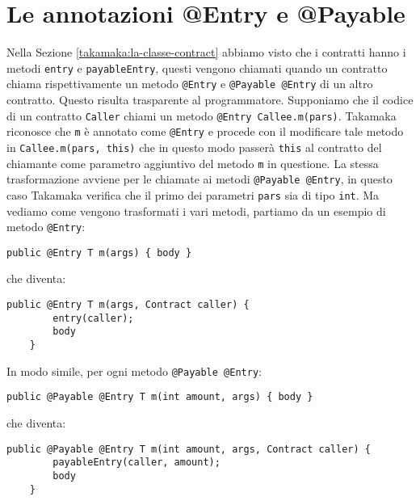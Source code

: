 \section{Le annotazioni @Entry e @Payable}	\label{takamaka:le-annotazioni}
Nella Sezione \ref{takamaka:la-classe-contract} abbiamo visto che i contratti hanno i metodi \lstinline|entry| e \lstinline|payableEntry|, questi vengono chiamati quando un contratto chiama rispettivamente un metodo \lstinline|@Entry| e \lstinline|@Payable @Entry| di un altro contratto. Questo risulta trasparente al programmatore. Supponiamo che il codice di un contratto \lstinline|Caller| chiami un metodo \lstinline|@Entry Callee.m(pars)|. Takamaka riconosce che \lstinline|m| è annotato come \lstinline|@Entry| e procede con il modificare tale metodo in \lstinline|Callee.m(pars, this)| che in questo modo passerà \lstinline|this| al contratto del chiamante come parametro aggiuntivo del metodo \lstinline|m| in questione. La stessa trasformazione avviene per le chiamate ai metodi \lstinline|@Payable @Entry|, in questo caso Takamaka verifica che il primo dei parametri \lstinline|pars| sia di tipo \lstinline|int|. Ma vediamo come vengono trasformati i vari metodi, partiamo da un esempio di metodo \lstinline|@Entry|:
%
\begin{lstlisting}[numbers=none,frame=none]
	public @Entry T m(args) { body }
\end{lstlisting}
%
che diventa:
%
\begin{lstlisting}[numbers=none,frame=none]
	public @Entry T m(args, Contract caller) {
		entry(caller);
		body
	}
\end{lstlisting}
%
In modo simile, per ogni metodo \lstinline|@Payable @Entry|:
%
\begin{lstlisting}[numbers=none,frame=none]
	public @Payable @Entry T m(int amount, args) { body }
\end{lstlisting}
%
che diventa:
%
\begin{lstlisting}[numbers=none,frame=none]
	public @Payable @Entry T m(int amount, args, Contract caller) {
		payableEntry(caller, amount);
		body
	}
\end{lstlisting}
%

